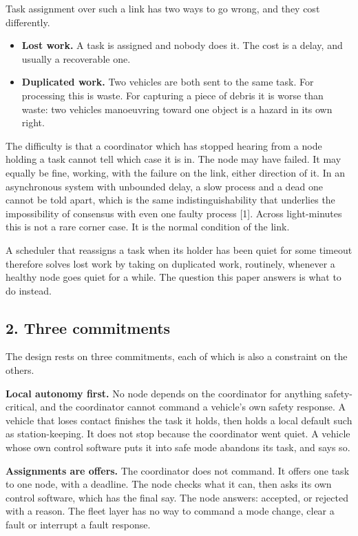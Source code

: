 \documentclass[
  12pt,
  letterpaper,
]{article}
\providecommand{\tightlist}{%
  \setlength{\itemsep}{0pt}\setlength{\parskip}{0pt}}
\begin{document}
Task assignment over such a link has two ways to go wrong, and they cost
differently.

\begin{itemize}
\tightlist
\item
  \textbf{Lost work.} A task is assigned and nobody does it. The cost is
  a delay, and usually a recoverable one.
\item
  \textbf{Duplicated work.} Two vehicles are both sent to the same task.
  For processing this is waste. For capturing a piece of debris it is
  worse than waste: two vehicles manoeuvring toward one object is a
  hazard in its own right.
\end{itemize}

The difficulty is that a coordinator which has stopped hearing from a
node holding a task cannot tell which case it is in. The node may have
failed. It may equally be fine, working, with the failure on the link,
either direction of it. In an asynchronous system with unbounded delay,
a slow process and a dead one cannot be told apart, which is the same
indistinguishability that underlies the impossibility of consensus with
even one faulty process {[}1{]}. Across light-minutes this is not a rare
corner case. It is the normal condition of the link.

A scheduler that reassigns a task when its holder has been quiet for
some timeout therefore solves lost work by taking on duplicated work,
routinely, whenever a healthy node goes quiet for a while. The question
this paper answers is what to do instead.

\hypertarget{three-commitments}{%
\subsection{2. Three commitments}\label{three-commitments}}

The design rests on three commitments, each of which is also a
constraint on the others.

\textbf{Local autonomy first.} No node depends on the coordinator for
anything safety-critical, and the coordinator cannot command a vehicle's
own safety response. A vehicle that loses contact finishes the task it
holds, then holds a local default such as station-keeping. It does not
stop because the coordinator went quiet. A vehicle whose own control
software puts it into safe mode abandons its task, and says so.

\textbf{Assignments are offers.} The coordinator does not command. It
offers one task to one node, with a deadline. The node checks what it
can, then asks its own control software, which has the final say. The
node answers: accepted, or rejected with a reason. The fleet layer has
no way to command a mode change, clear a fault or interrupt a fault
response.
\end{document}
